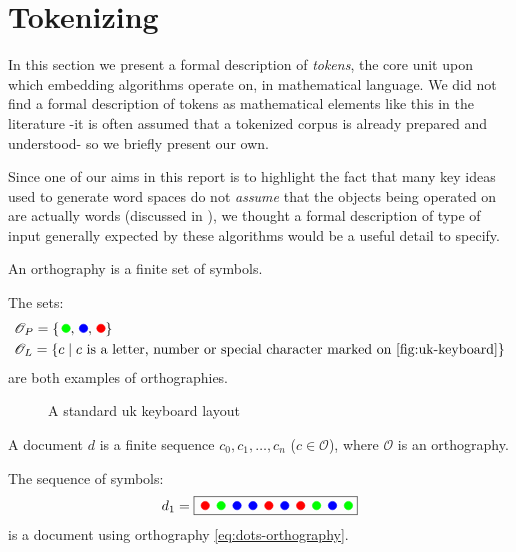 \section{Tokenizing}
In this section we present a formal description of \emph{tokens}, the core unit upon which embedding algorithms operate on, in mathematical language. We did not find a formal description of tokens as mathematical elements like this in the literature -it is often assumed that a tokenized corpus is already prepared and understood- so we briefly present our own.

Since one of our aims in this report is to highlight the fact that many key ideas used to generate word spaces do not \emph{assume} that the objects being operated on are actually words (discussed in ), we thought a formal description of type of input generally expected by these algorithms would be a useful detail to specify.
\begin{definition}[Orthography]\label{def:orthography}
  An orthography is a finite set of symbols.
\end{definition}

\begin{example}\label{ex:orthographies}
  The sets:
  \begin{align}
    &\mathscr{O}_P=\{\mycirc[green], \mycirc[blue], \mycirc[red]\}\label{eq:dots-orthography}\\
    &\mathscr{O}_L=\{c\mid\text{$c$ is a letter, number or special character marked on \autoref{fig:uk-keyboard}}\}\label{eq:keyboard-orthography}
  \end{align}
  are both examples of orthographies.
\end{example}
\vspace{6pt}

\begin{figure}[ht]
 \centering
 
 \caption{A standard uk keyboard layout}
 \label{fig:uk-keyboard}
\end{figure}

\begin{definition}[Document]
  A document $d$ is a finite sequence $c_0,c_1,\dots,c_n$ ($c\in\mathscr{O}$), where $\mathscr{O}$ is an orthography.
\end{definition}

\begin{example}\label{ex:doc-plato}
  The sequence of symbols:
  \[
    d_1=\fbox{\mycirc[red] \mycirc[green] \mycirc[blue] \mycirc[blue] \mycirc[red] \mycirc[blue] \mycirc[red] \mycirc[green] \mycirc[blue] \mycirc[green]}\label{eq:dots-document}
  \]
  is a document using orthography \eqref{eq:dots-orthography}.
\end{example}

